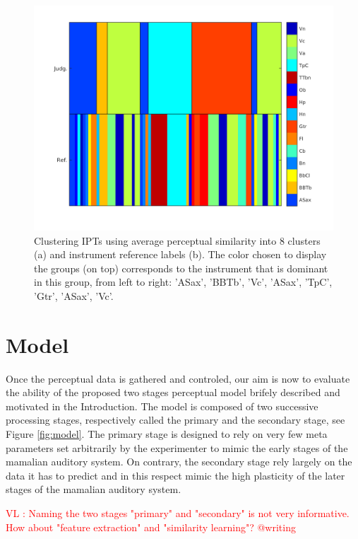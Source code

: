 \documentclass{article}
\newcommand{\ipts}{IPTs\xspace}
\newcommand{\vl}[1]{\textcolor{red}{VL : #1}}
\begin{document}
\begin{figure}
\center
\includegraphics[width = \textwidth]{figures/groupInstruments.png}
\caption{Clustering \ipts using average perceptual similarity into 8 clusters (a) and instrument reference labels (b). The color chosen to display the groups (on top) corresponds  to the instrument that is dominant in this group, from left to right: 'ASax', 'BBTb', 'Vc', 'ASax', 'TpC', 'Gtr', 'ASax', 'Vc'.}
\label{fig:gi}
\end{figure}

\section{Model}\label{sec:model}

Once the perceptual data is gathered and controled, our aim is now to evaluate the ability of the proposed two stages perceptual model brifely described and motivated in the Introduction. The model is composed of two successive processing stages, respectively called the primary and the secondary stage, see Figure \ref{fig:model}. The primary stage is designed to rely on very few meta parameters set arbitrarily by the experimenter to mimic the early stages of the mamalian auditory system. On contrary, the secondary stage rely largely on the data it has to predict and in this respect mimic the high plasticity of the later stages of the mamalian auditory system.

\vl{Naming the two stages "primary" and "secondary" is not very informative.
How about "feature extraction" and "similarity learning"? @writing}
\end{document}
